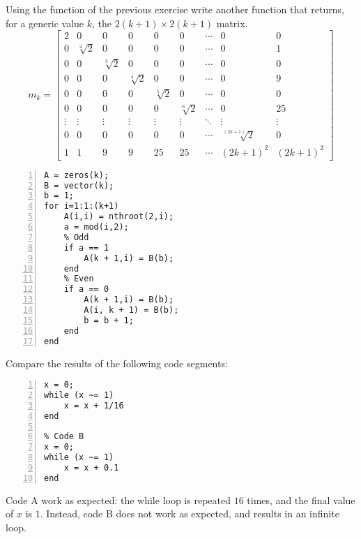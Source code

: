 \documentclass[12pt, a4paper]{report}
\newtheorem[style=M,bodystyle=\normalfont]{theorem}{Theorem}
\newtheorem[style=M,bodystyle=\normalfont]{corollary}{Corollary}
\newtheorem[style=M,bodystyle=\normalfont]{lemma}{Lemma}
\newtheorem[style=M,bodystyle=\normalfont]{definition}{Definition}
\begin{document}
    \begin{Exercise}[label=3]
        Using the function of the previous exercise write another function that returns, for a generic value $k$, the $2(k + 1) \times 2(k + 1)$ matrix.
        \[
            m_k=
            \begin{bmatrix}
                2 & 0 & 0 & 0 & 0 & 0 & \cdots & 0 & 0 \\
                0 & \sqrt[2]{2} & 0 & 0 & 0 & 0 & \cdots & 0 & 1 \\
                0 & 0 & \sqrt[3]{2} & 0 & 0 & 0 & \cdots & 0 & 0 \\
                0 & 0 & 0 & \sqrt[4]{2} & 0 & 0 & \cdots & 0 & 9 \\
                0 & 0 & 0 & 0 & \sqrt[5]{2} & 0 & \cdots & 0 & 0 \\
                0 & 0 & 0 & 0 & 0 & \sqrt[6]{2} & \cdots & 0 & 25 \\
                \vdots  & \vdots  & \vdots  & \vdots  & \vdots  & \vdots  & \ddots & \vdots  & \vdots  \\
                0 & 0 & 0 & 0 & 0 & 0 & \cdots & \sqrt[(2k+1)]{2} & 0 \\
                1 & 1 & 9 & 9 & 25 & 25 & \cdots & (2k+1)^2 & (2k+1)^2 
            \end{bmatrix} 
        \]
    \end{Exercise}
    \begin{Answer}[ref=3]
        \begin{lstlisting}[frame=single, numbers=left, style=Matlab-bw]
A = zeros(k);
B = vector(k);
b = 1;
for i=1:1:(k+1)
    A(i,i) = nthroot(2,i);
    a = mod(i,2);
    % Odd
    if a == 1
        A(k + 1,i) = B(b);
    end
    % Even 
    if a == 0
        A(k + 1,i) = B(b);
        A(i, k + 1) = B(b);
        b = b + 1;
    end
end
        \end{lstlisting}
    \end{Answer}

    \newpage

    \begin{Exercise}[label=4]
        Compare the results of the following code segments:
        \begin{lstlisting}[frame=single, numbers=left, style=Matlab-bw]
% Code A
x = 0;
while (x ~= 1)
    x = x + 1/16
end

% Code B
x = 0;
while (x ~= 1)
    x = x + 0.1
end
        \end{lstlisting}
    \end{Exercise}
    \begin{Answer}[ref=4]
        Code A work as expected: the while loop is repeated $16$ times, and the final value of $x$ is $1$. Instead, code B does not work as expected, and results in an infinite loop.
    \end{Answer}
\end{document}
